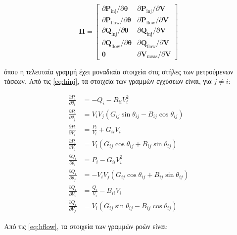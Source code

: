 \begin{equation}
\mathbf{H} =
\begin{bmatrix}
\partial \mathbf{P}_{\mathrm{inj}} / \partial \boldsymbol{\theta} & \partial \mathbf{P}_{\mathrm{inj}} / \partial \mathbf{V} \\
\partial \mathbf{P}_{\mathrm{flow}} / \partial \boldsymbol{\theta} & \partial \mathbf{P}_{\mathrm{flow}} / \partial \mathbf{V} \\
\partial \mathbf{Q}_{\mathrm{inj}} / \partial \boldsymbol{\theta} & \partial \mathbf{Q}_{\mathrm{inj}} / \partial \mathbf{V} \\
\partial \mathbf{Q}_{\mathrm{flow}} / \partial \boldsymbol{\theta} & \partial \mathbf{Q}_{\mathrm{flow}} / \partial \mathbf{V} \\
\mathbf{0} & \partial \mathbf{V}_{\mathrm{meas}} / \partial \mathbf{V}
\end{bmatrix}
\label{eq:jacblocks}
\end{equation}

όπου η τελευταία γραμμή έχει μοναδιαία στοιχεία στις στήλες των μετρούμενων τάσεων. Από τις
\eqref{eq:hinj}, τα στοιχεία των γραμμών εγχύσεων είναι, για $j \neq i$:

\begin{align}
\frac{\partial P_i}{\partial \theta_i} &= -Q_i - B_{ii} V_i^2 \\
\frac{\partial P_i}{\partial \theta_j} &= V_i V_j \left( G_{ij}\sin\theta_{ij} - B_{ij}\cos\theta_{ij} \right) \\
\frac{\partial P_i}{\partial V_i} &= \frac{P_i}{V_i} + G_{ii} V_i \\
\frac{\partial P_i}{\partial V_j} &= V_i \left( G_{ij}\cos\theta_{ij} + B_{ij}\sin\theta_{ij} \right) \\
\frac{\partial Q_i}{\partial \theta_i} &= P_i - G_{ii} V_i^2 \\
\frac{\partial Q_i}{\partial \theta_j} &= -V_i V_j \left( G_{ij}\cos\theta_{ij} + B_{ij}\sin\theta_{ij} \right) \\
\frac{\partial Q_i}{\partial V_i} &= \frac{Q_i}{V_i} - B_{ii} V_i \\
\frac{\partial Q_i}{\partial V_j} &= V_i \left( G_{ij}\sin\theta_{ij} - B_{ij}\cos\theta_{ij} \right)
\label{eq:jacinj}
\end{align}

Από τις \eqref{eq:hflow}, τα στοιχεία των γραμμών ροών είναι:

